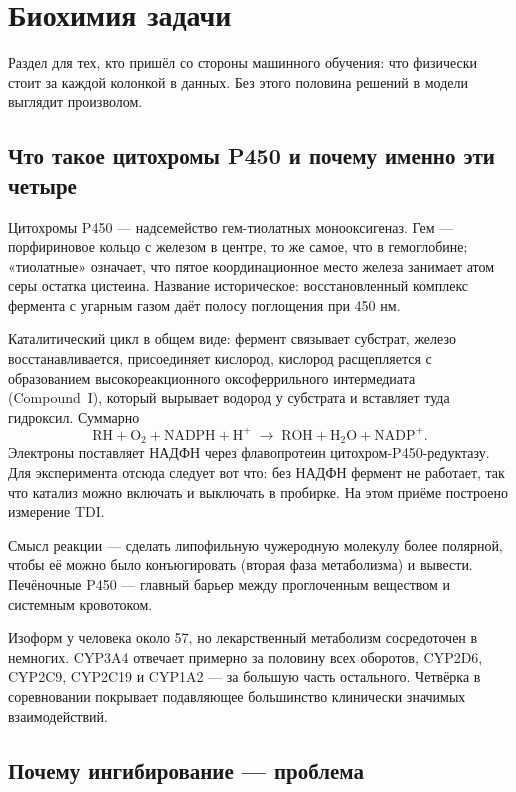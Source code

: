 \section{Биохимия задачи}
\label{sec:bio}

Раздел для тех, кто пришёл со стороны машинного обучения: что физически стоит за каждой колонкой
в данных. Без этого половина решений в модели выглядит произволом.

\subsection{Что такое цитохромы P450 и почему именно эти четыре}

Цитохромы P450 --- надсемейство гем-тиолатных монооксигеназ. Гем --- порфириновое кольцо с железом
в центре, то же самое, что в гемоглобине; «тиолатные» означает, что пятое координационное место железа
занимает атом серы остатка цистеина. Название историческое: восстановленный комплекс фермента с угарным
газом даёт полосу поглощения при 450 нм.

Каталитический цикл в общем виде: фермент связывает субстрат, железо восстанавливается, присоединяет
кислород, кислород расщепляется с образованием высокореакционного оксоферрильного интермедиата
(Compound~I), который вырывает водород у субстрата и вставляет туда гидроксил. Суммарно
\[
\text{RH} + \text{O}_2 + \text{NADPH} + \text{H}^+ \;\longrightarrow\;
\text{ROH} + \text{H}_2\text{O} + \text{NADP}^+ .
\]
Электроны поставляет НАДФН через флавопротеин цитохром-P450-редуктазу. Для эксперимента отсюда следует вот что: без НАДФН фермент не работает, так что катализ можно включать
и выключать в пробирке. На этом приёме построено измерение TDI.

Смысл реакции --- сделать липофильную чужеродную молекулу более полярной, чтобы её можно было
конъюгировать (вторая фаза метаболизма) и вывести. Печёночные P450 --- главный барьер между
проглоченным веществом и системным кровотоком.

Изоформ у человека около 57, но лекарственный метаболизм сосредоточен в немногих. CYP3A4 отвечает
примерно за половину всех оборотов, CYP2D6, CYP2C9, CYP2C19 и CYP1A2 --- за большую часть остального.
Четвёрка в соревновании покрывает подавляющее большинство клинически значимых взаимодействий.

\subsection{Почему ингибирование --- проблема}

